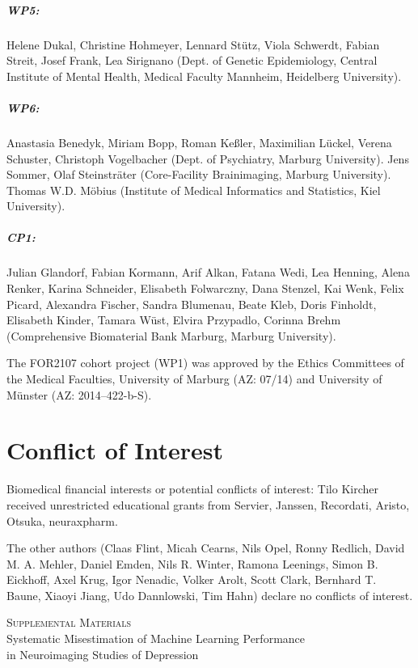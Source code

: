 \documentclass[12pt,a4paper]{article}
\renewcommand{\shorttitle}{Performance Misestimation in Neuroimaging Studies of Depression}
\begin{document}
    \subparagraph{WP5:} Helene Dukal, Christine Hohmeyer, Lennard Stütz, Viola Schwerdt, Fabian Streit, Josef Frank, Lea Sirignano (Dept. of Genetic Epidemiology, Central Institute of Mental Health, Medical Faculty Mannheim, Heidelberg University).

    \subparagraph{WP6:} Anastasia Benedyk, Miriam Bopp, Roman Keßler, Maximilian Lückel, Verena Schuster, Christoph Vogelbacher (Dept. of Psychiatry, Marburg University). Jens Sommer, Olaf Steinsträter (Core-Facility Brainimaging, Marburg University). Thomas W.D. Möbius (Institute of Medical Informatics and Statistics, Kiel University).

    \subparagraph{CP1:} Julian Glandorf, Fabian Kormann, Arif Alkan, Fatana Wedi, Lea Henning, Alena Renker, Karina Schneider, Elisabeth Folwarczny, Dana Stenzel, Kai Wenk, Felix Picard, Alexandra Fischer, Sandra Blumenau, Beate Kleb, Doris Finholdt, Elisabeth Kinder, Tamara Wüst, Elvira Przypadlo, Corinna Brehm (Comprehensive Biomaterial Bank Marburg, Marburg University).

    The FOR2107 cohort project (WP1) was approved by the Ethics Committees of the Medical Faculties, University of Marburg (AZ: 07/14) and University of Münster (AZ: 2014--422-b-S).

    \section*{Conflict of Interest}
    Biomedical financial interests or potential conflicts of interest: Tilo Kircher received unrestricted educational grants from Servier, Janssen, Recordati, Aristo, Otsuka, neuraxpharm.

    The other authors (Claas Flint, Micah Cearns, Nils Opel, Ronny Redlich, David M. A. Mehler, Daniel Emden, Nils R. Winter, Ramona Leenings, Simon B. Eickhoff, Axel Krug, Igor Nenadic, Volker Arolt, Scott Clark, Bernhard T. Baune, Xiaoyi Jiang, Udo Dannlowski, Tim Hahn) declare no conflicts of interest.


    
    


    \newpage
    \appendix


    \renewcommand{\shorttitle}{Performance Misestimation in Neuroimaging Studies of Depression}
    \begin{center}
        \LARGE{\textsc{Supplemental Materials}} \\ \Large{Systematic Misestimation of Machine Learning Performance \\ in Neuroimaging Studies of Depression}
    \end{center}
\end{document}
